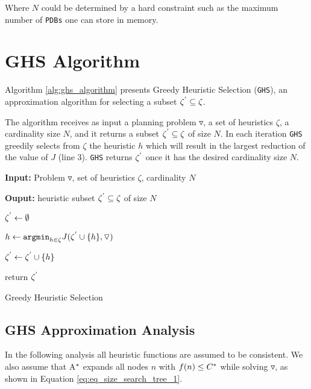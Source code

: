 Where $N$ could be determined by a hard constraint such as the maximum number of \texttt{PDBs} one can store in memory.

\section{GHS Algorithm}
\noindent
Algorithm \ref{alg:ghs_algorithm} presents Greedy Heuristic Selection (\texttt{GHS}), an approximation algorithm for selecting a subset $\zeta\sp{'} \subseteq \zeta$.

The algorithm receives as input a planning problem $\triangledown$, a set of heuristics $\zeta$, a cardinality size $N$, and it returns a subset $\zeta\sp{'} \subseteq \zeta$ of size $N$. In each iteration \texttt{GHS} greedily selects from $\zeta$ the heuristic $h$ which will result in the largest reduction of the value of $J$ (line 3). \texttt{GHS} returns $\zeta\sp{'}$ once it has the desired cardinality size $N$.\\

\begin{algorithm}[H]
 
\textbf{Input:} Problem $\triangledown$, set  of heuristics $\zeta$, cardinality $N$
 
\textbf{Ouput:} heuristic subset $\zeta\sp{'} \subseteq \zeta$ of size $N$
 
$\zeta\sp{'} \leftarrow \emptyset$
 
 {
 
	$h \leftarrow \texttt{argmin}_{h \in \zeta} J(\zeta\sp{'} \cup \{h\}, \triangledown) $
 
	$\zeta\sp{'} \leftarrow \zeta\sp{'} \cup \{h\}$
 
	return $\zeta\sp{'}$
}
\caption{Greedy Heuristic Selection}
\label{alg:ghs_algorithm}
\end{algorithm}

\subsection{GHS Approximation Analysis}
In the following analysis all heuristic functions are assumed to be consistent. We also assume that A$\sp{*}$ expands all nodes $n$ with $f(n) \leq C\sp{*}$ while solving $\triangledown$, as shown in Equation \eqref{eq:eq_size_search_tree_1}.

